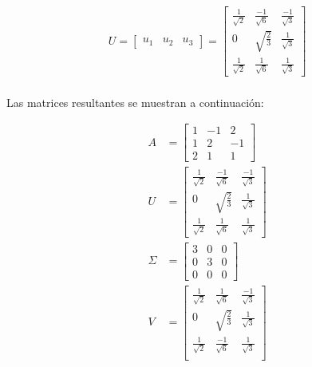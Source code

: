 \documentclass[a4paper, spanish]{article}
\begin{document}
  \begin{align}
    U =
    \begin{bmatrix}
      u_1 & u_2 & u_3
    \end{bmatrix} =
    \begin{bmatrix}
      \frac{1}{\sqrt{2}} & \frac{-1}{\sqrt{6}} & \frac{-1}{\sqrt{3}} \\
      0 & \sqrt{\frac{2}{3}} & \frac{1}{\sqrt{3}} \\
      \frac{1}{\sqrt{2}} & \frac{1}{\sqrt{6}} & \frac{1}{\sqrt{3}}
    \end{bmatrix}
  \end{align}

  \paragraph{}
  Las matrices resultantes se muestran a continuación:

  \begin{align}
    A &=
    \begin{bmatrix}
      1 & -1 & 2\\
      1 & 2 & -1\\
      2 & 1 & 1
    \end{bmatrix} \\
    U &=
    \begin{bmatrix}
      \frac{1}{\sqrt{2}} & \frac{-1}{\sqrt{6}} & \frac{-1}{\sqrt{3}} \\
      0 & \sqrt{\frac{2}{3}} & \frac{1}{\sqrt{3}} \\
      \frac{1}{\sqrt{2}} & \frac{1}{\sqrt{6}} & \frac{1}{\sqrt{3}}
    \end{bmatrix} \\
    \Sigma &=
    \begin{bmatrix}
      3 & 0 & 0\\
      0 & 3 & 0\\
      0 & 0 & 0
    \end{bmatrix} \\
    V &=
    \begin{bmatrix}
      \frac{1}{\sqrt{2}} & \frac{1}{\sqrt{6}} & \frac{-1}{\sqrt{3}} \\
      0 & \sqrt{\frac{2}{3}} &\frac{1}{\sqrt{3}} \\
      \frac{1}{\sqrt{2}} & \frac{-1}{\sqrt{6}} & \frac{1}{\sqrt{3}} \\
    \end{bmatrix}
  \end{align}
\end{document}
